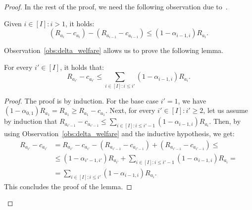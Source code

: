 \begin{proof}
	In the rest of the proof, we need the following observation due to~\citet{dutting2019simple}.
	\begin{observation}\label{obs:delta_welfare}
		Given $i \in [I] : i > 1$, it holds:
		\[
			\left(  R_{a_i} - c_{a_i} \right) - \left(  R_{a_{i-1}} - c_{a_{i-1}} \right) \leq 	\left(  1 - \alpha_{i-1, i} \right) R_{a_i}.
		\]
	\end{observation}
	Observation~\ref{obs:delta_welfare} allows us to prove the following lemma.
	\begin{lemma}\label{lem:telescoping}
		For every  $i' \in [I]$, it holds that:
		\[
			R_{a_{i'}} - c_{a_{i'}} \leq \sum_{i \in [I]: i \leq i'} \left(  1  -\alpha_{i-1,i} \right) R_{a_i} .
		\]
	\end{lemma}
	\begin{proof}
		The proof is by induction.
		For the base case $i' = 1$, we have $\left( 1 - \alpha_{0,1} \right) R_{a_1} = R_{a_1} \geq R_{a_1} - c_{a_1}$.
		Next, for every $i' \in [I]: i'\geq 2$, let us assume by induction that $R_{a_{i' - 1}} - c_{a_{i' -1}} \leq \sum_{i \in [I]: i \leq i' -1} \left(  1  -\alpha_{i-1,i} \right) R_{a_i} $.
		Then, by using Observation~\ref{obs:delta_welfare} and the inductive hypothesis, we get:
		\begin{align*}
			R_{a_{i'}} - c_{a_{i'}} & = R_{a_{i'}} - c_{a_{i'}} - \left(  R_{a_{i' -1}} - c_{a_{i' -1}} \right) + \left(  R_{a_{i' -1}} - c_{a_{i' -1}} \right) \leq \\
			& \leq \left(  1  -\alpha_{i'-1,i'} \right) R_{a_{i'}} + \sum_{i \in [I]: i \leq i' -1} \left(  1  -\alpha_{i-1,i} \right) R_{a_i} = \\
			& = \sum_{i \in [I]: i \leq i'} \left(  1  -\alpha_{i-1,i} \right) R_{a_i}.
		\end{align*}
		This concludes the proof of the lemma.
	\end{proof}
	

\end{proof}
